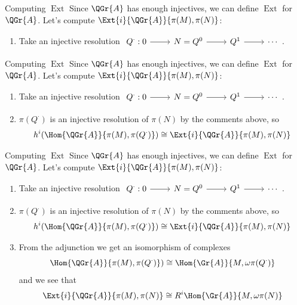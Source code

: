 \documentclass{beamer}
\theoremstyle{definition}
\begin{document}
\begin{frame}[fragile]{Computing $\operatorname{Ext}$}
  Since $\QGr{A}$ has enough injectives, we can define $\operatorname{Ext}$ for $\QGr{A}$.
  Let's compute $\Ext{i}{\QGr{A}}{\pi(M), \pi(N)}$:
  \begin{enumerate}
    \item
      Take an injective resolution $\begin{tikzcd}Q^\cdot : 0 \arrow{r} & N = Q^0 \arrow{r} & Q^1 \arrow{r} & \cdots \end{tikzcd}$.
  \end{enumerate}
\end{frame}

\begin{frame}[fragile]{Computing $\operatorname{Ext}$}
  Since $\QGr{A}$ has enough injectives, we can define $\operatorname{Ext}$ for $\QGr{A}$.
  Let's compute $\Ext{i}{\QGr{A}}{\pi(M), \pi(N)}$:
  \begin{enumerate}
  \item
    Take an injective resolution $\begin{tikzcd}Q^\cdot : 0 \arrow{r} & N = Q^0 \arrow{r} & Q^1 \arrow{r} & \cdots \end{tikzcd}$.
  \item
    $\pi(Q^\cdot)$ is an injective resolution of $\pi(N)$ by the comments above, so 
    $$h^i(\Hom{\QGr{A}}{\pi(M), \pi(Q^\cdot)}) \cong \Ext{i}{\QGr{A}}{\pi(M), \pi(N)}$$
  \end{enumerate}
\end{frame}

\begin{frame}[fragile]{Computing $\operatorname{Ext}$}
  Since $\QGr{A}$ has enough injectives, we can define $\operatorname{Ext}$ for $\QGr{A}$.
  Let's compute $\Ext{i}{\QGr{A}}{\pi(M), \pi(N)}$:
  \begin{enumerate}
  \item
    Take an injective resolution $\begin{tikzcd}Q^\cdot : 0 \arrow{r} & N = Q^0 \arrow{r} & Q^1 \arrow{r} & \cdots \end{tikzcd}$.
  \item
    $\pi(Q^\cdot)$ is an injective resolution of $\pi(N)$ by the comments above, so $$h^i(\Hom{\QGr{A}}{\pi(M), \pi(Q^\cdot)}) \cong \Ext{i}{\QGr{A}}{\pi(M), \pi(N)}$$
  \item
    From the adjunction we get an isomorphism of complexes
    $$\Hom{\QGr{A}}{\pi(M), \pi(Q^\cdot)}) \cong \Hom{\Gr{A}}{M, \omega\pi(Q^\cdot)}$$
    and we see that 
    $$\Ext{i}{\QGr{A}}{\pi(M), \pi(N)} \cong R^i\Hom{\Gr{A}}{M, \omega\pi(N)}$$
  \end{enumerate}
\end{frame}
\end{document}
